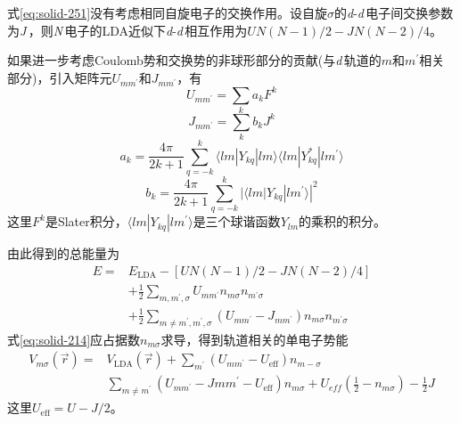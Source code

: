 {式\eqref{eq:solid-251}没有考虑相同自旋电子的交换作用。设自旋$\sigma$的{\textit d}-{\textit d}\,电子间交换参数为{\textit J}\,，则{\textit N}\,电子的LDA近似下{\textit d}-{\textit d}\,相互作用为$UN(N-1)/2-JN(N-2)/4$。

如果进一步考虑Coulomb势和交换势的非球形部分的贡献(与{\textit d}\,轨道的$m$和$m^{\prime}$相关部分)，引入矩阵元$U_{mm^{\prime}}$和$J_{mm^{\prime}}$，有
\begin{equation}
  U_{mm^{\prime}}=\sum_ka_kF^k
  \label{eq:solid-210}
\end{equation}
\begin{equation}
  J_{mm^{\prime}}=\sum_kb_kJ^k
  \label{eq:solid-211}
\end{equation}
\begin{equation}
  a_k=\frac{4\pi}{2k+1}\sum_{q=-k}^k\langle lm|Y_{kq}|lm\rangle\langle lm|Y_{kq}^{\ast}|lm^{\prime}\rangle
  \label{eq:solid-212}
\end{equation}
\begin{equation}
  b_k=\frac{4\pi}{2k+1}\sum_{q=-k}^k|\langle lm|Y_{kq}|lm^{\prime}\rangle|^2
  \label{eq:solid-213}
\end{equation}
这里$F^k$是Slater积分，$\langle lm|Y_{kq}|lm^{\prime}\rangle$是三个球谐函数$Y_{lm}$的乘积的积分。

由此得到的总能量为
\begin{equation}
  \begin{split}
	  E=&E_{\mathrm{LDA}}-[UN(N-1)/2-JN(N-2)/4]\\
  &+\frac12\sum_{m,m^{\prime},\sigma}U_{mm^{\prime}}n_{m\sigma}n_{m^{\prime}\sigma}\\
  &+\frac12\sum_{m\neq m^{\prime},m^{\prime},\sigma}(U_{mm^{\prime}}-J_{mm^{\prime}})n_{m\sigma}n_{m^{\prime}\sigma}
  \end{split}
  \label{eq:solid-214}
\end{equation}
式\eqref{eq:solid-214}应占据数$n_{m\sigma}$求导，得到轨道相关的单电子势能
\begin{equation}
  \begin{split}
	  V_{m\sigma}(\vec r)=&V_{\mathrm{LDA}}(\vec r)+\sum_{m^{\prime}}(U_{mm^{\prime}}-U_{\mathrm{eff}})n_{m-\sigma}\\
	  &\sum_{m\neq m^{\prime}}(U_{mm^{\prime}}-J{mm^{\prime}}-U_{\mathrm{eff}})n_{m\sigma}+U_{eff}\left(\frac12-n_{m\sigma}\right)-\frac12J
  \end{split}
  \label{eq:solid-215}
\end{equation}
这里$U_{\mathrm{eff}}=U-J/2$。

}
